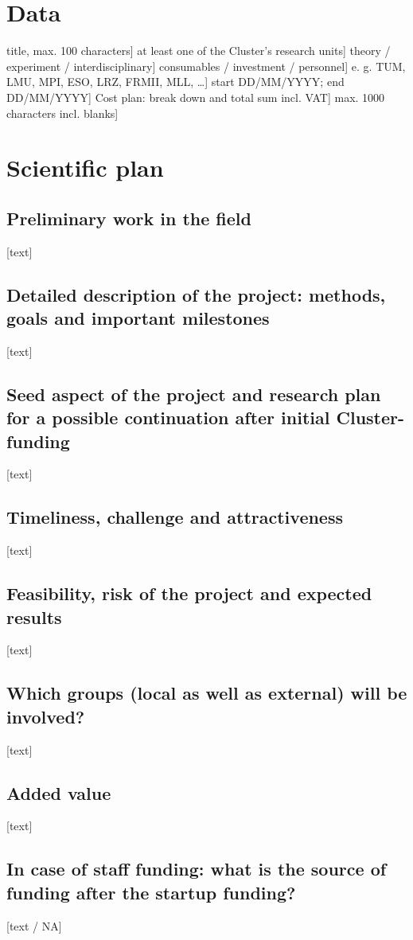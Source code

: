 \documentclass{seedproposal}
\begin{document}

\section{Data}

\info{Title of the project:}{[}title, max. 100 characters{]}
\info{Research Unit(s):}{[}at least one of the Cluster's research units{]}
\info{Category:}{[}theory / experiment / interdisciplinary{]}
\info{Funding of:}{[}consumables / investment / personnel{]}
\info{Involvement of others:}{[}e. g. TUM, LMU, MPI, ESO, LRZ, FRMII, MLL, \ldots{]}
\info{Time scale of the project:}{[}start DD/MM/YYYY; end DD/MM/YYYY{]}
\info{Requested Budget:}{[}Cost plan: break down and total sum incl. VAT{]}
\info{Short project summary:}{[}max. 1000 characters incl. blanks{]}

\section{Scientific plan}

\subsection{Preliminary work in the field}
{[}text{]}

\subsection{Detailed description of the project: methods, goals and
important milestones}
{[}text{]}

\subsection{Seed aspect of the project and research plan for a possible
continuation after initial Cluster-funding}
{[}text{]}

\subsection{Timeliness, challenge and attractiveness}
{[}text{]}

\subsection{Feasibility, risk of the project and expected results}
{[}text{]}

\subsection{Which groups (local as well as external) will be involved?}
{[}text{]}

\subsection{Added value}
{[}text{]}

\subsection{In case of staff funding: what is the source of funding
after the startup funding?}
{[}text / NA{]}
\end{document}
